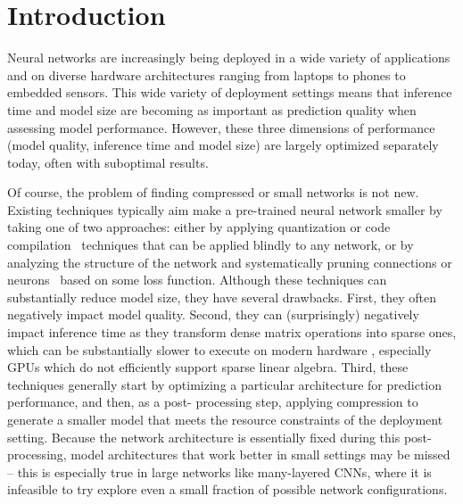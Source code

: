 
\section{Introduction}

Neural networks are increasingly being deployed in a wide variety  of
applications  and on diverse hardware architectures ranging from laptops to
phones to embedded sensors. This wide variety of deployment settings means
that inference time and model size are becoming as important as  prediction
quality when assessing model performance.  However, these three dimensions of
performance (model quality, inference time and model size)  are largely
optimized separately today, often with suboptimal results.

Of course, the problem of finding compressed or small networks is not new.
Existing techniques typically aim make a pre-trained neural network smaller
by taking one of two approaches:  either by
applying quantization \cite{quant} or code compilation~\cite{ma2016compilation}
techniques that can be applied blindly to any network, or by analyzing the
structure of the network and systematically pruning
connections or neurons~\cite{han2015deepcompression,Cun}
based on some loss function.  Although these techniques can substantially
reduce model size, they have several drawbacks.  First, they often negatively
impact model quality.  Second, they can (surprisingly) negatively impact
inference time as they transform dense matrix operations into sparse ones,
which can be substantially slower to execute on modern hardware
\cite{han2015deepcompression}, especially GPUs which do not efficiently support sparse
linear algebra.  Third, these techniques generally start by optimizing a
particular architecture for prediction performance, and then, as a post-
processing step, applying compression  to generate a smaller model that meets the
resource constraints of the deployment setting.  Because the network
architecture is essentially fixed during this post-processing,   model architectures
that work better in small settings may be missed -- this is especially true in
large networks like many-layered CNNs,  where it is infeasible to try explore
even a small fraction of possible network configurations.



